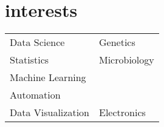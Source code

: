 \documentclass[10pt]{article}
\begin{document}
\begin{minipage}[ht]{.25\linewidth}
   \section*{interests}
   \flushright
   {\footnotesize
      \begin{tabularx}{\linewidth}{p{.5\linewidth}p{.5\linewidth}}
         Data Science & Genetics \\
         Statistics & Microbiology \\
         Machine Learning & \\
         Automation & \\
         Data Visualization & Electronics \\
      \end{tabularx}
   }
   \flushleft
   \section*{}
\end{minipage}
\end{document}
